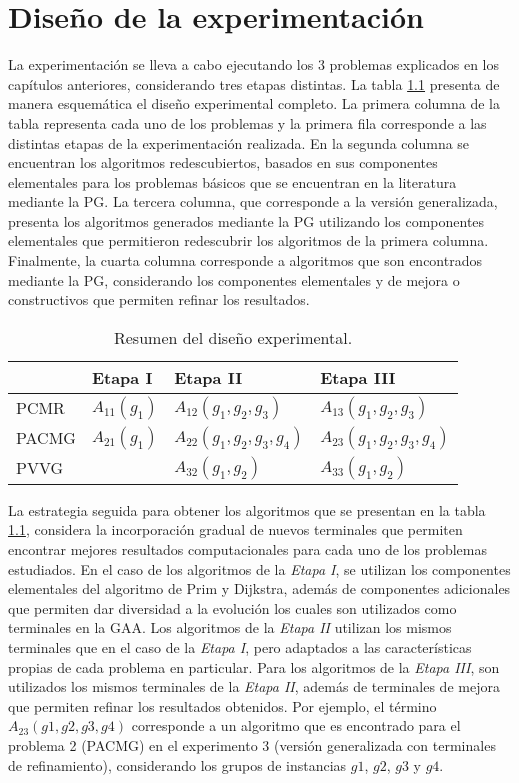 \chapter{Diseño de la experimentación}\label{cap:disegno_experimento}

La experimentación se lleva a cabo ejecutando los 3 problemas explicados en los capítulos anteriores, considerando tres etapas distintas. La tabla \ref{tab:diseno_experimental} presenta de manera esquemática el diseño experimental completo. La primera columna de la tabla representa cada uno de los problemas y la primera fila corresponde a las distintas etapas de la experimentación realizada. En la segunda columna se encuentran los algoritmos redescubiertos, basados en sus componentes elementales para los problemas básicos que se encuentran en la literatura mediante la PG. La tercera columna, que corresponde a la versión generalizada, presenta los algoritmos generados mediante la PG utilizando los componentes elementales que permitieron redescubrir los algoritmos de la primera columna. Finalmente, la cuarta columna corresponde a algoritmos que son encontrados mediante la PG, considerando los componentes elementales y de mejora o constructivos que permiten refinar los resultados.

\begin{table}[H]
	\centering
	\caption{Resumen del diseño experimental.}
	\begin{tabular}{llll}
				& Etapa I		& Etapa II						& Etapa III\\\hline
		PCMR	& $A_{11}(g_1)$	& $A_{12}(g_1, g_2, g_3)$		& $A_{13}(g_1, g_2, g_3)$\\
		PACMG	& $A_{21}(g_1)$	& $A_{22}(g_1, g_2, g_3, g_4)$	& $A_{23}(g_1, g_2, g_3, g_4)$\\
		PVVG	&				& $A_{32}(g_1, g_2)$			& $A_{33}(g_1, g_2)$\\\hline
	\end{tabular}
	\label{tab:diseno_experimental}
\end{table}

La estrategia seguida para obtener los algoritmos que se presentan en la tabla \ref{tab:diseno_experimental}, considera la incorporación gradual de nuevos terminales que permiten encontrar mejores resultados computacionales para cada uno de los problemas estudiados. En el caso de los algoritmos de la \textit{Etapa I}, se utilizan los componentes elementales del algoritmo de Prim y Dijkstra, además de componentes adicionales que permiten dar diversidad a la evolución los cuales son utilizados como terminales en la GAA. Los algoritmos de la \textit{Etapa II} utilizan los mismos terminales que en el caso de la \textit{Etapa I}, pero adaptados a las características propias de cada problema en particular. Para los algoritmos de la \textit{Etapa III}, son utilizados los mismos terminales de la \textit{Etapa II}, además de terminales de mejora que  permiten refinar los resultados obtenidos. Por ejemplo, el término $A_{23}(g1, g2, g3, g4)$ corresponde a un algoritmo que es encontrado para el problema 2 (PACMG) en el experimento 3 (versión generalizada con terminales de refinamiento), considerando los grupos de instancias $g1$, $g2$, $g3$ y $g4$.


